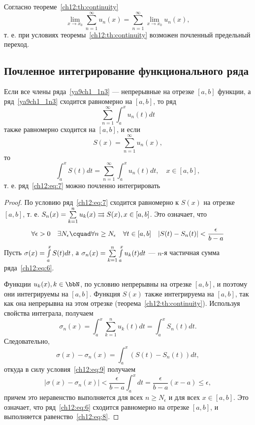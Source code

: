 \begin{cons}
	Согласно теореме~\eqref{ch12:th:continuity}
	$$
		\lim_{x \to x_0} \sum_{n = 1}^{\infty} u_n(x) = \sum_{n = 1}^{\infty} \lim_{x \to x_0} u_n(x),
	$$
	т. е. при условиях теоремы~\eqref{ch12:th:continuity} возможен почленный предельный переход.
\end{cons}

\subsection{Почленное интегрирование функционального ряда}

\begin{thm}
	\label{ch12:th:integration}
	Если все члены ряда~\eqref{ya9ch1_1n3} --- непрерывные на отрезке $[a, b]$ функции,
	а ряд~\eqref{ya9ch1_1n3} сходится равномерно на $[a, b]$, то ряд
	\begin{equation}
		\label{ch12:eq:6}
		\sum_{n=1}^{\infty} \int_a^x u_n(t)dt
	\end{equation}
	также равномерно сходится на $[a, b]$, и если
	\begin{equation}
		\label{ch12:eq:7}
		S(x) = \sum_{n=1}^{\infty} u_n(x),
	\end{equation}
	то
	\begin{equation}
		\label{ch12:eq:8}
		\int_a^x S(t)dt = \sum_{n=1}^{\infty} \int_a^x u_n(t)dt, \quad x \in [a, b],
	\end{equation}
	т. е. ряд~\eqref{ch12:eq:7} можно почленно интегрировать
\end{thm}
\begin{proof}
	По условию ряд~\eqref{ch12:eq:7} сходится равномерно к $S(x)$ на отрезке $[a, b]$,
	т. е. $S_n(x) = \sum_{k=1}^{n}\limits u_k(x) \rightrightarrows S(x), x \in [a, b]$.
	Это означает, что
	\begin{equation}
		\label{ch12:eq:9}
		\forall \epsilon > 0 \quad \exists N_{\epsilon} \cquad \forall n \ge N_{\epsilon} \quad
			\forall t \in [a, b] \quad |S(t) - S_n(t)| < \frac{\epsilon}{b - a}
	\end{equation}
	Пусть $\sigma(x) = \int_a^x\limits S(t)dt$, а $\sigma_n(x) = \sum_{k=1}^n\limits \int_a^x\limits u_k(t)dt$ ---
	$n$-я частичная сумма ряда~\eqref{ch12:eq:6}.

	Функции $u_k(x), k \in \bbN$, по условию непрерывны на отрезке $[a, b]$, и поэтому
	они интегрируемы на $[a, b]$. Функция $S(x)$ также интегрируема на $[a, b]$, так как
	она непрерывна на этом отрезке (теорема~\ref{ch12:th:continuity}).
	Используя свойства интеграла, получаем
	$$
		\sigma_n(x) = \int_a^x \sum_{k=1}^n u_k(t)dt = \int_a^x S_n(t)dt.
	$$
	Следовательно,
	$$
		\sigma(x) - \sigma_n(x) = \int_a^x (S(t) - S_n(t))dt,
	$$
	откуда в силу условия~\eqref{ch12:eq:9} получаем
	$$
		|\sigma(x) - \sigma_n(x)| < \frac{\epsilon}{b - a} \int_a^x dt = \frac{\epsilon}{b - a} (x - a) \le \epsilon,
	$$
	причем это неравенство выполняется для всех $n \ge N_{\epsilon}$ и для всех $x \in [a, b]$.
	Это означает, что ряд~\eqref{ch12:eq:6} сходится равномерно на отрезке $[a, b]$,
	и выполняется равенство~\eqref{ch12:eq:8}.
\end{proof}

